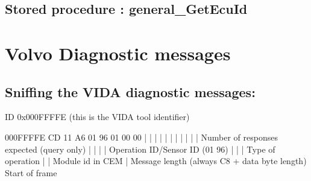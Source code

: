 \documentclass[letterpaper,10pt,english]{sphinxmanual}
\begin{document}
\section{Stored procedure : general\_GetEcuId}
\label{\detokenize{vin:stored-procedure-general-getecuid}}

\chapter{Volvo Diagnostic messages}
\label{\detokenize{volvo-diagnostic:volvo-diagnostic-messages}}\label{\detokenize{volvo-diagnostic::doc}}
\noindent{}


\section{Sniffing the VIDA diagnostic messages:}
\label{\detokenize{volvo-diagnostic:sniffing-the-vida-diagnostic-messages}}
\sphinxAtStartPar
ID 0x000FFFFE (this is the VIDA tool identifier)

\begin{sphinxVerbatim}[commandchars=\\\{\}]
000FFFFE CD 11 A6 01 96 01 00 00
    |     |  |  |  |    |
    |     |  |  |  |    \PYGZsq{}\PYGZhy{}\PYGZhy{}\PYGZhy{}\PYGZhy{}\PYGZhy{}\PYGZhy{}\PYGZhy{}\PYGZhy{}\PYGZhy{} Number of responses expected (query only)
    |     |  |  |  \PYGZsq{}\PYGZhy{}\PYGZhy{}\PYGZhy{}\PYGZhy{}\PYGZhy{}\PYGZhy{}\PYGZhy{}\PYGZhy{}\PYGZhy{}\PYGZhy{}\PYGZhy{}\PYGZhy{}\PYGZhy{}\PYGZhy{} Operation ID/Sensor ID (01 96)
    |     |  |  \PYGZsq{}\PYGZhy{}\PYGZhy{}\PYGZhy{}\PYGZhy{}\PYGZhy{}\PYGZhy{}\PYGZhy{}\PYGZhy{}\PYGZhy{}\PYGZhy{}\PYGZhy{}\PYGZhy{}\PYGZhy{}\PYGZhy{}\PYGZhy{}\PYGZhy{}\PYGZhy{} Type of operation
    |     |  \PYGZsq{}\PYGZhy{}\PYGZhy{}\PYGZhy{}\PYGZhy{}\PYGZhy{}\PYGZhy{}\PYGZhy{}\PYGZhy{}\PYGZhy{}\PYGZhy{}\PYGZhy{}\PYGZhy{}\PYGZhy{}\PYGZhy{}\PYGZhy{}\PYGZhy{}\PYGZhy{}\PYGZhy{}\PYGZhy{}\PYGZhy{} Module id in CEM
    |     \PYGZsq{}\PYGZhy{}\PYGZhy{}\PYGZhy{}\PYGZhy{}\PYGZhy{}\PYGZhy{}\PYGZhy{}\PYGZhy{}\PYGZhy{}\PYGZhy{}\PYGZhy{}\PYGZhy{}\PYGZhy{}\PYGZhy{}\PYGZhy{}\PYGZhy{}\PYGZhy{}\PYGZhy{}\PYGZhy{}\PYGZhy{}\PYGZhy{}\PYGZhy{}\PYGZhy{} Message length (always C8 + data byte length)
    \PYGZsq{}\PYGZhy{}\PYGZhy{}\PYGZhy{}\PYGZhy{}\PYGZhy{}\PYGZhy{}\PYGZhy{}\PYGZhy{}\PYGZhy{}\PYGZhy{}\PYGZhy{}\PYGZhy{}\PYGZhy{}\PYGZhy{}\PYGZhy{}\PYGZhy{}\PYGZhy{}\PYGZhy{}\PYGZhy{}\PYGZhy{}\PYGZhy{}\PYGZhy{}\PYGZhy{}\PYGZhy{}\PYGZhy{}\PYGZhy{} Start of frame
\end{sphinxVerbatim}
\end{document}
